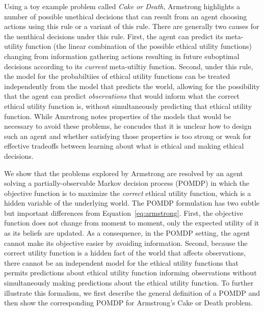 \documentclass[11pt]{article}
\begin{document}
Using a toy example problem called {\em Cake or Death}, Armstrong highlights a number of possible unethical decisions that can result from an agent choosing actions using this rule or a variant of this rule. There are generally two causes for the uenthical decisions under this rule. First, the agent can predict its meta-utility function (the linear combination of the possible ethical utility functions) changing from information gathering actions resulting in future suboptimal decisions according to its {\em current} meta-utiltiy function. Second, under this rule, the model for the probabiltiies of ethical utility functions can be treated independently from the model that predicts the world, allowing for the possibility that the agent can predict {\em observations} that would inform what the correct ethical utility function is, without simultaneously predicting that ethical utility function. While Amrstrong notes properties of the models that would be necessary to avoid these problems, he concudes that it is unclear how to design such an agent and whether satisfying those properties is too strong or weak for effective tradeoffs between learning about what is ethical and making ethical decisions.



We show that the problems explored by Armstrong are resolved by an agent solving a partially-observable Markov decision process (POMDP) in which the objective function is to maximize the {\em correct} ethical utility function, which is a hidden variable of the underlying world. The POMDP formulation has two subtle but important differences from Equation~\ref{eq:armstrong}. First, the objective function does not change from moment to moment, only the expected utility of it as its beliefs are updated. As a consequence, in the POMDP setting, the agent cannot make its objective easier by avoiding information. Second, because the correct utility function is a hidden fact of the world that affects observations, there cannot be an independent model for the ethical utility functions that permits predictions about ethical utility function informing observations without simultaneously making predictions about the ethical utility function. To further illustrate this formalism, we first describe the general definition of a POMDP and then show the corresponding POMDP for Armstrong's Cake or Death problem.
\end{document}
